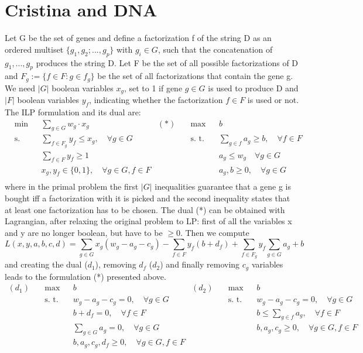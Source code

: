 \section{Cristina and DNA}
Let G be the set of genes and define a factorization f of the string D as an ordered multiset $\{g_1, g_2; ..., g_p\}$ with $g_i \in G$, such that the concatenation of $g_1, ..., g_p$ produces the string D. Let F be the set of all possible factorizations of D and $F_g:= \{f \in F : g \in f_g\}$ be the set of all factorizations that contain the gene g. We need $|G|$ boolean variables $x_g$, set to 1 if gene $g \in G$ is used to produce D and $|F|$ boolean variables $y_f$, indicating whether the factorization $f \in F$ is used or not. The ILP formulation and its dual are:
\begin{align*}
&\text{min} && \sum_{g \in G} w_g \cdot x_g & (*) \quad & \text{max}&& b  \\
&\text{s. t.} && \sum_{f \in F_g} y_f \leq x_g, \quad \forall g \in G &&\text{s. t.} && \sum_{g \in f} a_g \geq b, \quad \forall f \in F \\
&&& \sum_{f \in F} y_f \geq 1 &&&&  a_g \leq w_g \quad \forall g \in G\\
&&& x_g,y_f \in \{0,1\}, \quad \forall g \in G, f \in F &&&& a_g,b \geq 0, \quad \forall g \in G\\
\end{align*}
where in the primal problem the first $|G|$ inequalities guarantee that a gene g is bought iff a factorization with it is picked and the second inequality states that at least one factorization has to be chosen. The dual (*) can be obtained with Lagrangian, after relaxing the original problem to LP: first of all the variables x and y are no longer boolean, but have to be $\geq 0$. Then we compute
\[
L(x,y,a,b,c,d) = \sum_{g \in G} x_g (w_g - a_g - c_g) - \sum_{f \in F} y_f (b + d_f) + \sum_{f \in F_g} y_f\sum_{g \in G} a_g + b
\]
and creating the dual ($d_1$), removing $d_f$ ($d_2$) and finally removing $c_g$ variables leads to the formulation (*) presented above.
\begin{align*}
(d_1) \quad&\text{max} && b & (d_2)\quad& \text{max}&& b  \\
&\text{s. t.} && w_g -a_g-c_g = 0, \quad \forall g \in G &&\text{s. t.} && w_g - a_g -c_g = 0, \quad \forall g \in G \\
&&& b +d_f = 0, \quad \forall f \in F &&&&  b \leq \sum_{g \in f} a_g, \quad \forall f \in F\\
&&&\sum_{g \in G} a_g = 0, \quad \forall g \in G &&&& b,a_g,c_g \geq 0, \quad \forall g \in G, f \in F\\
&&& b,a_g,c_g,d_f \geq 0, \quad \forall g \in G, f \in F  &&&&\\
\end{align*}


